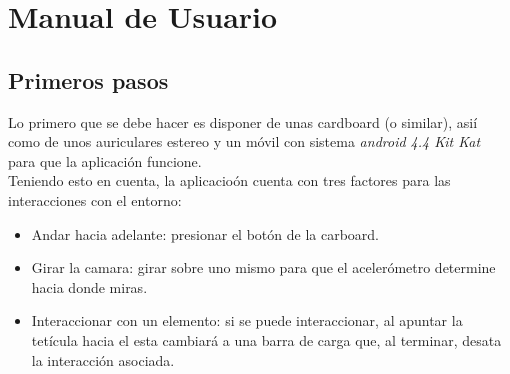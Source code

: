 \section{Manual de Usuario}

\subsection{Primeros pasos}

\quad Lo primero que se debe hacer es disponer de unas cardboard (o similar), asií como de unos auriculares estereo y un móvil con sistema \textit{android 4.4 Kit Kat} para que la aplicación funcione.\\

\quad Teniendo esto en cuenta, la aplicacioón cuenta con tres factores para las interacciones con el entorno: \\

\begin{itemize}
	\item Andar hacia adelante: presionar el botón de la carboard.
	\item Girar la camara: girar sobre uno mismo para que el acelerómetro determine hacia donde miras.
	\item Interaccionar con un elemento: si se puede interaccionar, al apuntar la tetícula hacia el esta cambiará a una barra de carga que, al terminar, desata la interacción asociada.
\end{itemize}

\newpage


